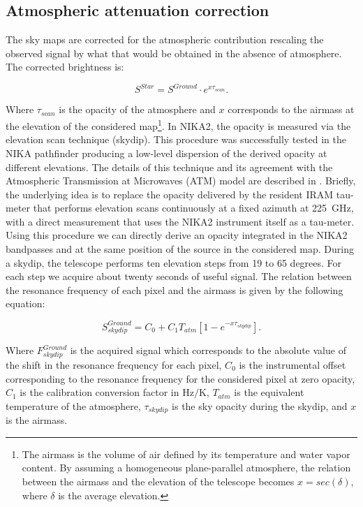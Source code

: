 \documentclass[]{aa} %
\begin{document}
\subsection{Atmospheric attenuation correction}
\label{Atmospheric attenuation correction}

The sky maps are corrected for the atmospheric contribution rescaling the observed signal by what that would be obtained in the absence of atmosphere. The corrected brightness is:

\begin{equation}
S^{Star} =  S^{Ground} \cdot e^{ x \tau_{scan}}.
\end{equation}

Where $\tau_{scan}$ is the opacity of the atmosphere and $x$ corresponds to the airmass at the elevation of the considered map\footnote{The airmass is the volume of air defined by its temperature and water vapor content. By assuming a homogeneous plane-parallel atmosphere, the relation between the airmass and the elevation of the telescope becomes $x = sec(\delta)$, where $\delta$ is the average elevation.}.
In NIKA2, the opacity is measured via the elevation scan technique (skydip). This procedure was successfully tested in the NIKA pathfinder producing a low-level dispersion of the derived opacity at different elevations. The details of this technique and its agreement with the Atmospheric Transmission at Microwaves (ATM) model \cite{2001IEEE....49.1683C} are described in \cite{Catalano2014}. Briefly, the underlying idea is to replace the opacity delivered by the resident IRAM tau-meter that performs elevation scans continuously at a fixed azimuth at 225~GHz, with a direct measurement that uses the NIKA2 instrument itself as a tau-meter. Using this procedure we can directly derive an opacity integrated in the NIKA2 bandpasses and at the same position of the source in the considered map. 
During a skydip, the telescope performs ten elevation steps from 19 to 65 degrees. For each step we acquire about twenty seconds of useful signal. The relation between the resonance frequency of each pixel and the airmass is given by the following equation:

\begin{equation}\label{eq:skydip}
S^{Ground}_{skydip} = C_0 + C_1 T_{atm}[1 - e^{- x \tau_{skydip}}].
\end{equation}

Where $F^{Ground}_{skydip}$ is the acquired signal which corresponds to the
absolute value of the shift in the resonance frequency for each pixel, $C_0$ is the
instrumental offset corresponding to the resonance frequency for the
considered pixel at zero opacity, $C_1$ is the calibration conversion factor in
$\mathrm{Hz/K}$, $T_{atm}$ is the equivalent temperature of the
atmosphere, $\tau_{skydip}$ is the sky opacity during the skydip, and $x$ is the airmass.
\end{document}
